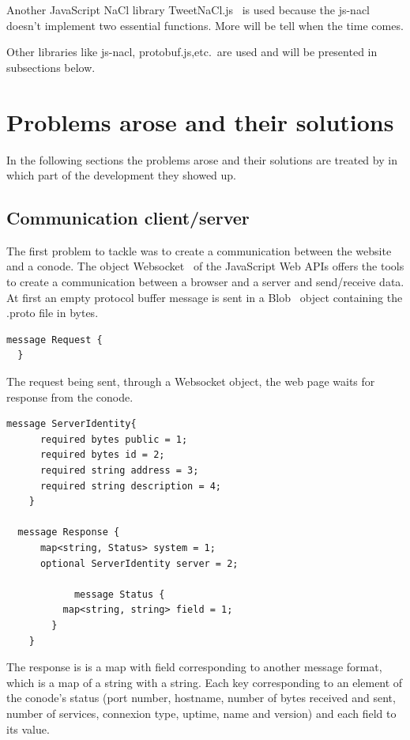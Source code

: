 \documentclass[11pt, a4paper, twoside, openright, openany]{article} %
\begin{document}
Another JavaScript NaCl library TweetNaCl.js~\cite{tweetNacl} is used because
the js-nacl doesn't implement two essential functions.
More will be tell when the time comes.
\bigbreak

Other libraries like js-nacl, protobuf.js,etc.\ are used and will be presented
in subsections below.
\bigbreak

\section{Problems arose and their solutions}
In the following sections the problems arose and their solutions are treated by
in which part of the development they showed up.
\bigbreak

\subsection{Communication client/server}
The first problem to tackle was to create a communication between the website
and a conode.
\newline
The object Websocket~\cite{websocketPage} of the JavaScript Web APIs offers the tools to create a communication
between a browser and a server and send/receive data.
\newline
At first an empty protocol buffer message is sent in a Blob~\cite{blob} object containing
the .proto file in bytes.
\bigbreak

\begin{lstlisting}[caption={Empty protocol buffer message}, captionpos=b]
  message Request {
  }
\end{lstlisting}

The request being sent, through a Websocket object, the web page waits for response from the conode.
\bigbreak

\begin{lstlisting}[caption={response protocol buffer message}, captionpos=b]
  message ServerIdentity{
      required bytes public = 1;
      required bytes id = 2;
      required string address = 3;
      required string description = 4;
	}

  message Response {
      map<string, Status> system = 1;
      optional ServerIdentity server = 2;

			message Status {
          map<string, string> field = 1;
    	}
	}
\end{lstlisting}
\leavevmode \newline

The response is is a map with field corresponding to another message format, which
is a map of a string with a string. Each key corresponding to an element of the conode's
status (port number, hostname, number of bytes received and sent, number of services,
 connexion type, uptime, name and version) and each field to its value.
\bigbreak
\end{document}
